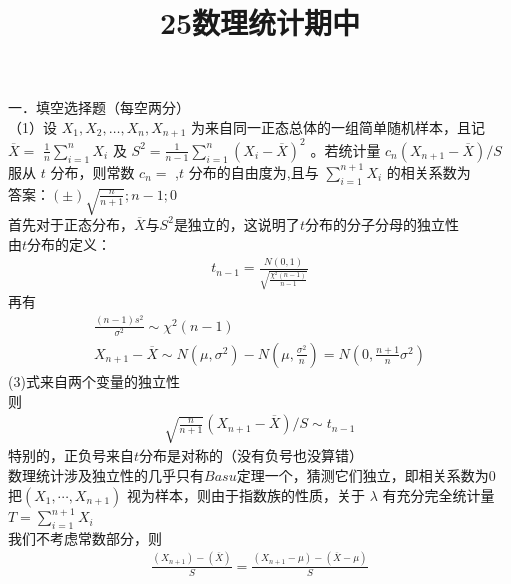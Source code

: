 \documentclass[12pt]{article}
\title{25数理统计期中}
\author{\textcalligra{NULIOUS}} %
\date{}
\begin{document}
\maketitle

\noindent 一．填空选择题（每空两分）\\
（1）设 $X_{1}, X_{2}, \ldots, X_{n}, X_{n+1}$ 为来自同一正态总体的一组简单随机样本，且记 $\overline{X}=$ $\frac{1}{n} \sum_{i=1}^{n} X_{i}$ 及 $S^{2}=\frac{1}{n-1} \sum_{i=1}^{n}\left(X_{i}-\overline{X}\right)^{2}$ 。若统计量 $c_{n}\left(X_{n+1}-\overline{X}\right) / S$ 服从 $t$ 分布，则常数 $c_{n}=$\underline{\hspace{1cm}} ,$t$ 分布的自由度为\underline{\hspace{1cm}},且与 $\sum_{i=1}^{n+1} X_{i}$ 的相关系数为\underline{\hspace{1cm}}\\
答案：$(\pm) \sqrt{\frac{n}{n+1}} ; n-1 ; 0$\\
首先对于正态分布，$\overline{X}$与$S^2$是独立的，这说明了$t$分布的分子分母的独立性\\
由$t$分布的定义：
\begin{gather}
t_{n-1}=\frac{N(0,1)}{\sqrt{\frac{\chi^2(n-1)}{n-1}}}
\end{gather}
再有\\
\begin{gather}
\frac{(n-1) s^2}{\sigma^2} \sim \chi^2(n-1) \\
X_{n+1} - \overline{X} \sim N\left(\mu, \sigma^2\right) - N\left(\mu, \frac{\sigma^2}{n}\right) = N\left(0, \frac{n+1}{n} \sigma^2\right)
\end{gather}
(3)式来自两个变量的独立性\\
则\\
\begin{gather}
\sqrt{\frac{n}{n+1}}\left(X_{n+1}-\overline{X}\right) / S \sim t_{n-1}
\end{gather}
特别的，正负号来自$t$分布是对称的（没有负号也没算错）\\
数理统计涉及独立性的几乎只有$Basu$定理一个，猜测它们独立，即相关系数为$0$\\
把$\left(X_1, \cdots, X_{n+1}\right)$ 视为样本，则由于指数族的性质，关于 $\lambda$ 有充分完全统计量$T=\sum_{i=1}^{n+1} X_i$\\
我们不考虑常数部分，则\\
\begin{gather}
\frac{\left(X_{n+1}\right)-\left(\overline{X}\right)}{S}=\frac{\left(X_{n+1}-\mu\right)-\left(\overline{X}-\mu\right)}{S}
\end{gather}
\end{document}
